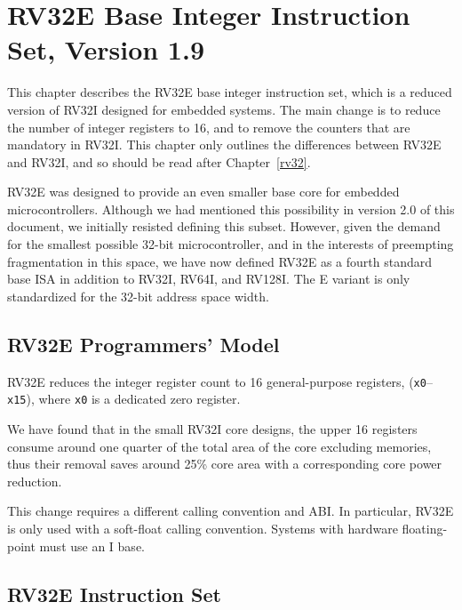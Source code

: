 \chapter{RV32E Base Integer Instruction Set, Version 1.9}
\label{rv32e}

This chapter describes the RV32E base integer instruction set, which
is a reduced version of RV32I designed for embedded systems.  The main
change is to reduce the number of integer registers to 16, and to
remove the counters that are mandatory in RV32I.  This chapter only
outlines the differences between RV32E and RV32I, and so should be
read after Chapter~\ref{rv32}.

\begin{commentary}
RV32E was designed to provide an even smaller base core for embedded
microcontrollers.  Although we had mentioned this possibility in
version 2.0 of this document, we initially resisted defining this
subset. However, given the demand for the smallest possible 32-bit
microcontroller, and in the interests of preempting fragmentation in
this space, we have now defined RV32E as a fourth standard base ISA in
addition to RV32I, RV64I, and RV128I.  The E variant is only
standardized for the 32-bit address space width.
\end{commentary}

\section{RV32E Programmers' Model}

RV32E reduces the integer register count to 16 general-purpose
registers, ({\tt x0}--{\tt x15}), where {\tt x0} is a dedicated zero
register.

\begin{commentary}
We have found that in the small RV32I core designs, the upper 16
registers consume around one quarter of the total area of the core
excluding memories, thus their removal saves around 25\% core area
with a corresponding core power reduction.
\end{commentary}

\begin{commentary}
This change requires a different calling convention and ABI.  In
particular, RV32E is only used with a soft-float calling convention.
Systems with hardware floating-point must use an I base.
\end{commentary}

\section{RV32E Instruction Set}

